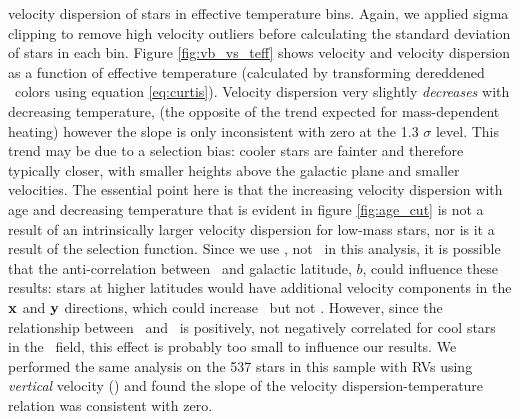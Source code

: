 velocity dispersion of stars in effective temperature bins.
Again, we applied sigma clipping to remove high velocity outliers before
calculating the standard deviation of stars in each bin.
Figure \ref{fig:vb_vs_teff} shows velocity and velocity dispersion
as a function of effective temperature (calculated by transforming dereddened
\gaia\ colors using equation \ref{eq:curtis}).
Velocity dispersion very slightly {\it decreases} with decreasing temperature,
(the opposite of the trend expected for mass-dependent heating) however the
slope is only inconsistent with zero at the 1.3 $\sigma$ level.
This trend may be due to a selection bias: cooler stars are fainter and
therefore typically closer, with smaller heights above the galactic plane and
smaller velocities.
The essential point here is that the increasing velocity dispersion with age
and decreasing temperature that is evident in figure \ref{fig:age_cut} is not
a result of an intrinsically larger velocity dispersion for low-mass stars,
nor is it a result of the selection function.
Since we use \vb, not \vz\ in this analysis, it is possible that the
anti-correlation between \teff\ and galactic latitude, $b$, could influence
these results: stars at higher latitudes would have additional velocity
components in the ${\bf x}$ and ${\bf y}$ directions, which could increase
\vb\ but not \vz.
However, since the relationship between \sigmavb\ and \teff\ is positively,
not negatively correlated for cool stars in the \kepler\ field, this effect is
probably too small to influence our results.
We performed the same analysis on the 537 stars in this sample with RVs using
{\it vertical} velocity (\vz) and found the slope of the velocity
dispersion-temperature relation was consistent with zero.


